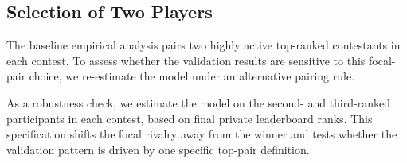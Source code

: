 \documentclass[mnsc]{informs3}
\begin{document}
\subsection{Selection of Two Players}\label{sect-robust-2players}

The baseline empirical analysis pairs two highly active top-ranked contestants in each contest.
To assess whether the validation results are sensitive to this focal-pair choice, we re-estimate the model under an alternative pairing rule.

As a robustness check, we estimate the model on the second- and third-ranked participants in each contest, based on final private leaderboard ranks.
This specification shifts the focal rivalry away from the winner and tests whether the validation pattern is driven by one specific top-pair definition.
\end{document}
